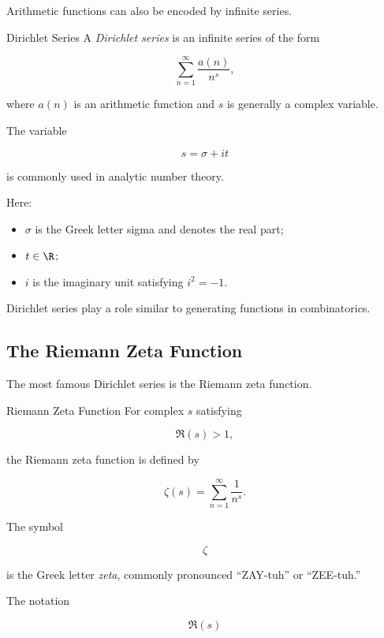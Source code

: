 Arithmetic functions can also be encoded by infinite series.

\begin{definitionbox}{Dirichlet Series}
A \emph{Dirichlet series} is an infinite series of the form

\[ \sum_{n=1}^{\infty}\frac{a(n)}{n^s}, \]

where \(a(n)\) is an arithmetic function and \(s\) is generally a complex
variable.
\end{definitionbox}

The variable

\[ s=\sigma+it \]

is commonly used in analytic number theory.

Here:

\begin{itemize}
    \item \(\sigma\) is the Greek letter sigma and denotes the real part;
    \item \(t\in\R\);
    \item \(i\) is the imaginary unit satisfying \(i^2=-1\).
\end{itemize}

Dirichlet series play a role similar to generating functions in
combinatorics.

\subsection{The Riemann Zeta Function}
\label{subsec:riemann-zeta-function}

The most famous Dirichlet series is the Riemann zeta function.

\begin{definitionbox}{Riemann Zeta Function}
For complex \(s\) satisfying

\[ \Re(s)>1, \]

the Riemann zeta function is defined by

\[ \boxed{\zeta(s)=\sum_{n=1}^{\infty}\frac{1}{n^s}.} \]
\end{definitionbox}

The symbol

\[ \zeta \]

is the Greek letter \emph{zeta}, commonly pronounced ``ZAY-tuh'' or
``ZEE-tuh.''

The notation

\[ \Re(s) \]

